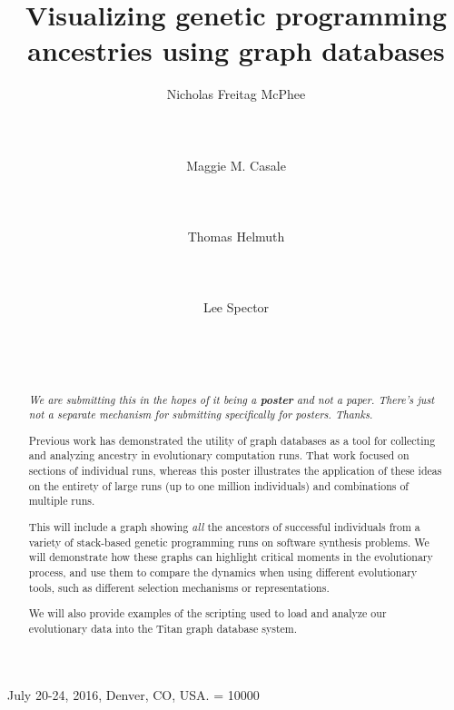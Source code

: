 \documentclass{sig-alternate}
\begin{document}
 {July 20-24, 2016, Denver, CO, USA.}
\widowpenalty = 10000
    
\title{Visualizing genetic programming ancestries using graph databases}

\author{
\alignauthor
Nicholas Freitag McPhee\\
	\\
	\\
	\\
\alignauthor
Maggie M. Casale\\
	\\
	\\
	\\
\alignauthor
Thomas Helmuth\\
	\\
	\\
	\\
\alignauthor
Lee Spector\\
	\\
	\\
	\\
}

\maketitle

\begin{abstract}

\emph{We are submitting this in the hopes of it being a \textbf{poster} and not a paper. There's just not a separate mechanism for submitting specifically for posters. Thanks.}

Previous work has demonstrated the utility of graph databases as a tool for collecting and analyzing ancestry in evolutionary computation runs. That work focused on sections of individual runs, whereas this poster illustrates the application of these ideas on the entirety of large runs (up to one million individuals) and combinations of multiple runs.

This will include a graph showing \emph{all} the ancestors of successful individuals from a variety of stack-based genetic programming runs on software synthesis problems. We will demonstrate how these graphs can highlight critical moments in the evolutionary process, and use them to compare the dynamics when using different evolutionary tools, such as different selection mechanisms or representations.

We will also provide examples of the scripting used to load and analyze our evolutionary data into the Titan graph database system.

\end{abstract}
\end{document}

